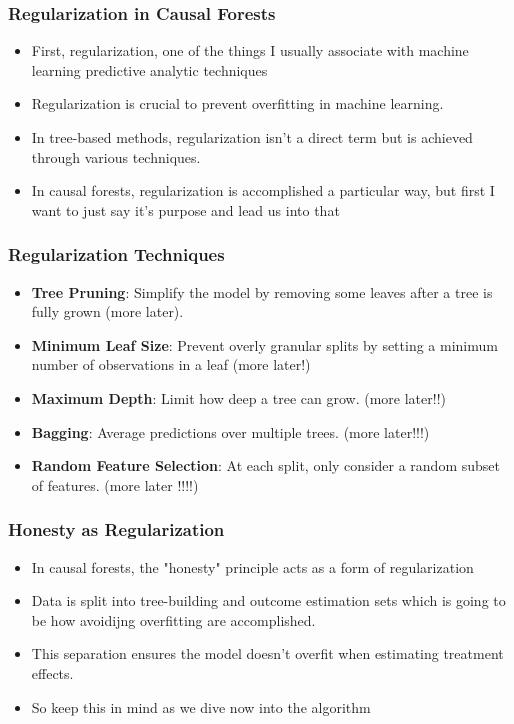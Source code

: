 \documentclass{beamer}
\begin{document}
\begin{frame}
\frametitle{Regularization in Causal Forests}
\begin{itemize}
\item First, regularization, one of the things I usually associate with machine learning predictive analytic techniques
\item Regularization is crucial to prevent overfitting in machine learning.
\item In tree-based methods, regularization isn't a direct term but is achieved through various techniques.
\item In causal forests, regularization is accomplished a particular way, but first I want to just say it's purpose and lead us into that
\end{itemize}
\end{frame}

\begin{frame}
\frametitle{Regularization Techniques}
\begin{itemize}
\item \textbf{Tree Pruning}: Simplify the model by removing some leaves after a tree is fully grown (more later).
\item \textbf{Minimum Leaf Size}: Prevent overly granular splits by setting a minimum number of observations in a leaf (more later!)
\item \textbf{Maximum Depth}: Limit how deep a tree can grow. (more later!!)
\item \textbf{Bagging}: Average predictions over multiple trees. (more later!!!)
\item \textbf{Random Feature Selection}: At each split, only consider a random subset of features. (more later !!!!)
\end{itemize}
\end{frame}

\begin{frame}
\frametitle{Honesty as Regularization}
\begin{itemize}
\item In causal forests, the "honesty" principle acts as a form of regularization
\item Data is split into tree-building and outcome estimation sets which is going to be how avoidijng overfitting are accomplished.
\item This separation ensures the model doesn't overfit when estimating treatment effects.
\item So keep this in mind as we dive now into the algorithm
\end{itemize}
\end{frame}
\end{document}
